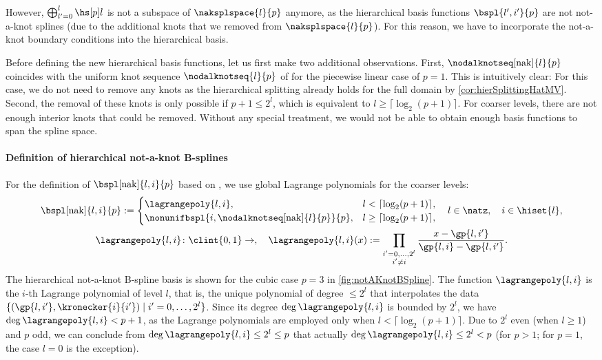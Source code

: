 However, $\bigoplus_{l'=0}^l \hsbspl{l}{p}$ is not a subspace of
$\naksplspace{l}{p}$ anymore,
as the hierarchical basis functions $\bspl{l',i'}{p}$ are not
not-a-knot splines (due to the additional knots that we removed from
$\naksplspace{l}{p}$).
For this reason,
we have to incorporate the not-a-knot boundary conditions into the
hierarchical basis.

Before defining the new hierarchical basis functions,
let us first make two additional observations.
First, $\nodalknotseq[\nak]{l}{p}$ coincides with the
uniform knot sequence $\nodalknotseq{l}{p}$ of 
for the piecewise linear case of $p = 1$.
This is intuitively clear:
For this case,
we do not need to remove any knots as the hierarchical splitting already
holds for the full domain by \cref{cor:hierSplittingHatMV}.
Second, the removal of these knots is only possible if $p + 1 \le 2^l$,
which is equivalent to $l \ge \lceil\log_2(p+1)\rceil$.
For coarser levels,
there are not enough interior knots that could be removed.
Without any special treatment,
we would not be able to obtain enough basis functions to span the spline space.

\paragraph{Definition of hierarchical not-a-knot B-splines}

For the definition of 
$\bspl[\nak]{l,i}{p}$ based on ,
we use global Lagrange polynomials for the coarser levels:
\begin{subequations}
   \label{eq:hierarchicalNotAKnotBSpline}
  \begin{gather}
    \bspl[\nak]{l,i}{p}
    :=
    \begin{cases}
      \lagrangepoly{l,i},&
      l < \lceil\log_2(p+1)\rceil,\\
      \nonunifbspl{i,\nodalknotseq[\nak]{l}{p}}{p},&
      l \ge \lceil\log_2(p+1)\rceil,
    \end{cases}\quad
    l \in \natz,\quad
    i \in \hiset{l},\\
    \lagrangepoly{l,i}\colon \clint{0, 1} \to \real,\quad
    \lagrangepoly{l,i}(x)
    := \prod_{\substack{i'=0,\dotsc,2^l\\i'\not=i}}
    \frac{x - \gp{l,i'}}{\gp{l,i} - \gp{l,i'}}.
  \end{gather}
\end{subequations}
The hierarchical not-a-knot B-spline basis is shown for the
cubic case $p = 3$ in \cref{fig:notAKnotBSpline}.
The function $\lagrangepoly{l,i}$ is the $i$-th Lagrange polynomial of level $l$,
that is,
the unique polynomial of degree $\le 2^l$ that interpolates the data
$\{(\gp{l,i'}, \kronecker{i}{i'}) \mid i' = 0, \dotsc, 2^l\}$.
Since its degree $\deg \lagrangepoly{l,i}$ is bounded by $2^l$,
we have $\deg \lagrangepoly{l,i} < p + 1$,
as the Lagrange polynomials are employed only when
$l < \lceil\log_2(p+1)\rceil$.
Due to $2^l$ even (when $l \ge 1$) and $p$ odd,
we can conclude from $\deg \lagrangepoly{l,i} \le 2^l \le p$ that actually
$\deg \lagrangepoly{l,i} \le 2^l < p$
(for $p > 1$; for $p = 1$, the case $l = 0$ is the exception).

